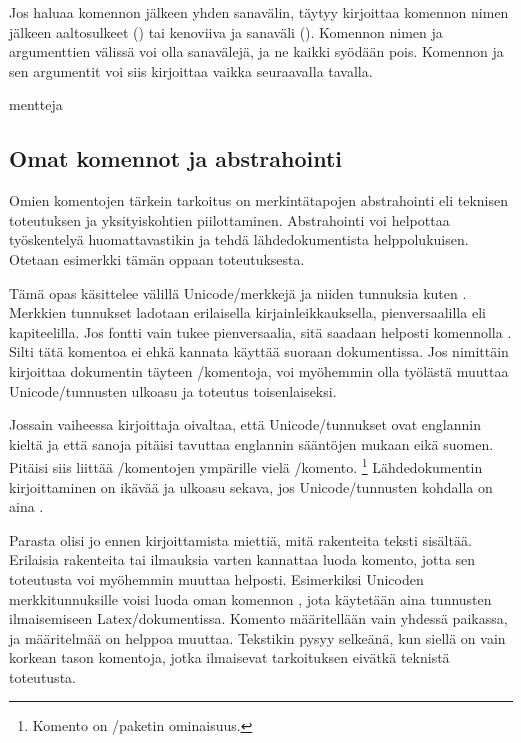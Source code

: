 Jos haluaa komennon jälkeen yhden sanavälin, täytyy kirjoittaa komennon
nimen jälkeen aaltosulkeet () tai kenoviiva ja
sanaväli (). Komennon nimen ja argumenttien
välissä voi olla sanavälejä, ja ne kaikki syödään pois. Komennon ja sen
argumentit voi siis kirjoittaa vaikka seuraavalla tavalla.

\begin{koodilohkosis}
     {mentteja}
\end{koodilohkosis}

\subsection{Omat komennot ja abstrahointi}

Omien komentojen tärkein tarkoitus on merkintätapojen abstrahointi eli
teknisen toteutuksen ja yksityiskohtien piilottaminen. Abstrahointi voi
helpottaa työskentelyä huomattavastikin ja tehdä lähdedokumentista
helppolukuisen. Otetaan esimerkki tämän oppaan toteutuksesta.

Tämä opas käsittelee välillä Unicode\-/merkkejä ja niiden tunnuksia
kuten . Merkkien tunnukset
ladotaan erilaisella kirjainleikkauksella, pienversaalilla eli
kapiteelilla. Jos fontti vain tukee pienversaalia, sitä saadaan helposti
komennolla . Silti tätä komentoa ei ehkä kannata
käyttää suoraan dokumentissa. Jos nimittäin kirjoittaa dokumentin
täyteen \-/komentoja, voi myöhemmin olla työlästä
muuttaa Unicode\-/tunnusten ulko\-asu ja toteutus toisenlaiseksi.

Jossain vaiheessa kirjoittaja oivaltaa, että Unicode\-/tunnukset ovat
englannin kieltä ja että sanoja pitäisi tavuttaa englannin sääntöjen
mukaan eikä suomen. Pitäisi siis liittää \-/komentojen ympärille vielä \-/komento.%
\footnote{Komento  on
  \-/paketin ominaisuus.} Lähdedokumentin
kirjoittaminen on ikävää ja ulko\-asu sekava, jos Unicode\-/tunnusten
kohdalla on aina .

Parasta olisi jo ennen kirjoittamista miettiä, mitä rakenteita teksti
sisältää. Erilaisia rakenteita tai ilmauksia varten kannattaa luoda
komento, jotta sen toteutusta voi myöhemmin muuttaa helposti.
Esimerkiksi Unicoden merkkitunnuksille voisi luoda oman komennon
, jota käytetään aina tunnusten ilmaisemiseen
Latex\-/dokumentissa. Komento määritellään vain yhdessä paikassa, ja
määritelmää on helppoa muuttaa. Tekstikin pysyy selkeänä, kun siellä on
vain korkean tason komentoja, jotka ilmaisevat tarkoituksen eivätkä
teknistä toteutusta.

